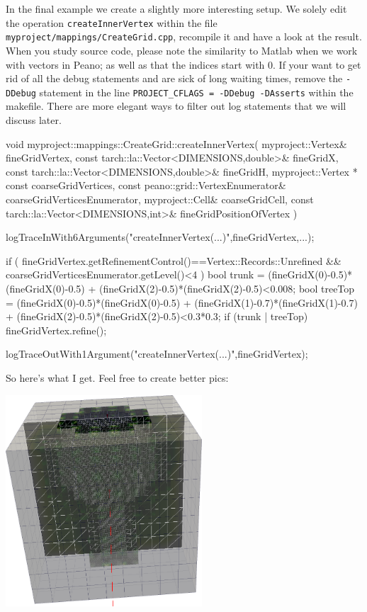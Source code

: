 In the final example we create a slightly more interesting setup. 
We solely edit the operation \texttt{createInnerVertex} within the  
file \texttt{myproject/mappings/CreateGrid.cpp}, recompile it and 
have a look at the result.
When you study source code, please note the similarity to Matlab when we work
with vectors in Peano; as well as that the indices start with 0.
If your want to get rid of all the debug statements and are sick of long 
waiting times, remove the \texttt{-DDebug} statement in the line  
\texttt{PROJECT\_CFLAGS = -DDebug -DAsserts}
within the makefile.
There are more elegant ways to filter out log statements that we will discuss
later.


\begin{code}

void myproject::mappings::CreateGrid::createInnerVertex(
 myproject::Vertex&                          fineGridVertex,
 const tarch::la::Vector<DIMENSIONS,double>& fineGridX,
 const tarch::la::Vector<DIMENSIONS,double>& fineGridH,
 myproject::Vertex * const                   coarseGridVertices,
 const peano::grid::VertexEnumerator&      coarseGridVerticesEnumerator,
 myproject::Cell&                            coarseGridCell,
 const tarch::la::Vector<DIMENSIONS,int>&    fineGridPositionOfVertex 
) {
 logTraceInWith6Arguments("createInnerVertex(...)",fineGridVertex,...);
  
 if (
   fineGridVertex.getRefinementControl()==Vertex::Records::Unrefined 
   &&
   coarseGridVerticesEnumerator.getLevel()<4
 ) {
   bool trunk = (fineGridX(0)-0.5)*(fineGridX(0)-0.5)
              + (fineGridX(2)-0.5)*(fineGridX(2)-0.5)<0.008;
   bool treeTop = (fineGridX(0)-0.5)*(fineGridX(0)-0.5)
                + (fineGridX(1)-0.7)*(fineGridX(1)-0.7)
                + (fineGridX(2)-0.5)*(fineGridX(2)-0.5)<0.3*0.3;
   if (trunk | treeTop) {
     fineGridVertex.refine();
   }
 }

 logTraceOutWith1Argument("createInnerVertex(...)",fineGridVertex);
}
\end{code}

So here's what I get. Feel free to create better pics:

\begin{center}
  \includegraphics[width=0.55\textwidth]{2_quickstart/tree.png}
\end{center}


